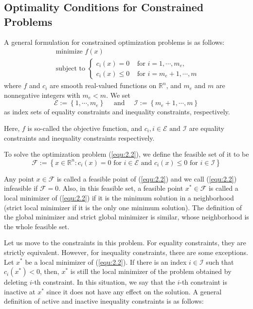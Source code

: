\subsection{Optimality Conditions for Constrained Problems}
A general formulation for constrained optimization problems is as follows: 
\begin{equation}
\label{equ:2.2}
\begin{array}{l}\textrm { minimize } f(x) \\ \textrm { subject to }\left\{\begin{array}{ll}c_{i}(x)=0 & \textrm { for } i=1, \cdots, m_{e}, \\ c_{i}(x) \leq 0 & \textrm { for } i=m_{e}+1, \cdots, m\end{array}\right.\end{array}
\end{equation}
where $f$ and $c_i$ are smooth real-valued functions on $\mathbb{R}^n$, and $m_e$ and $m$ are nonnegative integers with $m_e < m$. We set 
$$
\mathscr{E}:=\left\{1, \cdots, m_{e}\right\} \quad \textrm { and } \quad \mathscr{I}:=\left\{m_{e}+1, \cdots, m\right\}
$$
as index sets of equality constraints and inequality constraints, respectively. 
\par Here, $f$ is so-called the objective function, and $c_i, i \in \mathscr{E} \textrm{ and } \mathscr{I}$ are equality constraints and inequality constraints respectively. 
\par To solve the optimization problem (\ref{equ:2.2}), we define the feasible set of it to be
$$
\mathscr{F}:=\left\{x \in \mathbb{R}^{n}: c_{i}(x)=0 \textrm { for } i \in \mathscr{E} \textrm { and } c_{i}(x) \leq 0 \textrm { for } i \in \mathscr{I}\right\}
$$
\par Any point $x \in \mathscr{F}$ is called a feasible point of (\ref{equ:2.2}) and we call (\ref{equ:2.2}) infeasible if $\mathscr{F} = 0$. Also, in this feasible set, a feasible point $x^* \in \mathscr{F}$ is called a local minimizer of (\ref{equ:2.2}) if it is the minimum solution in a neighborhood (strict local minimizer if it is the only one minimum solution). The definition of the global minimizer and strict global minimizer is similar, whose neighborhood is the whole feasible set. 
\par Let us move to the constraints in this problem. For equality constraints, they are strictly equivalent. However, for inequality constraints, there are some exceptions. Let $x^*$ be a local minimizer of (\ref{equ:2.2}). If there is an index $i \in \mathscr{I}$ such that $c_i(x^*) < 0$, then, $x^*$ is still the local minimizer of the problem obtained by deleting $i$-th constraint. In this situation, we say that the $i$-th constraint is inactive at $x^*$ since it does not have any effect on the solution. A general definition of active and inactive inequality constraints is as follows:
